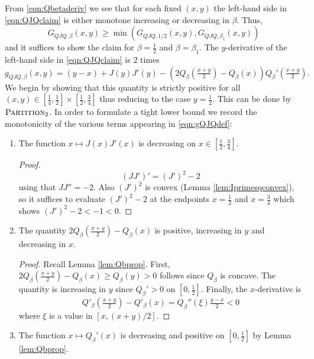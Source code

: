\documentclass[12pt]{amsart}
\theoremstyle{plain}
\theoremstyle{definition}
\theoremstyle{remark}
\numberwithin{equation}{section}
\begin{document}
From \eqref{eqn:Qbetaderiv} we see that for each fixed $(x,y)$ the left-hand side in \eqref{eqn:QJQclaim} is either monotone increasing or decreasing in $\beta$. 
Thus,
\[ G_{QJQ,\beta}(x,y)\ge \min(G_{QJQ,1/2}(x,y),G_{QJQ,\beta_1}(x,y)) \]
and it suffices to show the claim for $\beta=\tfrac12$ and $\beta=\beta_1$.
The $y$-derivative of the left-hand side in \eqref{eqn:QJQclaim} is $2$ times
\begin{equation}\label{eqn:gQJQdef}
g_{QJQ,\beta}(x,y)=(y-x) +J(y)J'(y)-(2Q_\beta(\tfrac{x+y}{2})-Q_\beta(x))Q_\beta'(\tfrac{x+y}{2}).
\end{equation}
We begin by showing that this quantity is strictly positive for all $(x,y)\in [\frac14,\frac12]\times [\frac12,\frac34]$ thus reducing to the case $y=\frac12$.
This can be done by $\textsc{Partition}_2$. In order to formulate a tight lower bound we record the monotonicity of the various terms appearing in \eqref{eqn:gQJQdef}:

\begin{enumerate}
\item The function $x\mapsto J(x)J'(x)$ is decreasing on $x\in [\frac12, \frac34]$.
\begin{proof}
\[(JJ')' = (J')^2-2\]
using that $JJ''=-2$.
Also $(J')^2$ is convex (Lemma \ref{lem:Iprimesqconvex}), so it suffices to evaluate $(J')^2-2$ at the endpoints $x=\frac12$ and $x=\frac34$ which shows $(J')^2-2<-1<0$.
\end{proof}
\item The quantity $2Q_\beta(\frac{x+y}2)-Q_\beta(x)$ is positive, increasing in $y$ and decreasing in $x$.
\begin{proof}
Recall Lemma \ref{lem:Qbprop}. First,
$2Q_\beta(\frac{x+y}2)-Q_\beta(x)\ge Q_\beta(y)>0$ follows since $Q_\beta$ is concave.
The quantity is increasing in $y$ since $Q_\beta'>0$ on $[0,\frac12]$. Finally, the $x$-derivative is
\[ Q'_\beta(\tfrac{x+y}{2})-Q'_\beta(x) = Q_\beta''(\xi) \tfrac{y-x}{2}<0 \]
where $\xi$ is a value in $[x,(x+y)/2]$.
\end{proof}
\item The function $x\mapsto Q_\beta'(x)$ is decreasing and positive on $[0,\frac12]$ by Lemma \ref{lem:Qbprop}.
\end{enumerate}
\end{document}
